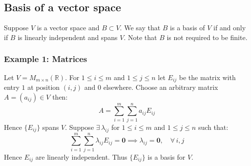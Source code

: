 \documentclass[12pt]{article}
\begin{document}
\subsection*{Basis of a vector space}
Suppose \(V\) is a vector space and \(B\subset V\). We say that \(B\) is a basis of \(V\) if and only if \(B\) is linearly independent and spans \(V\). Note that \(B\) is not required to be finite.
\subsubsection*{Example 1: Matrices}
Let \(V=M_{m\times n}(\mathbb{R})\). For \(1\leq i \leq m\) and \(1\leq j \leq n\) let \(E_{ij}\) be the matrix with entry \(1\) at position \((i,j)\) and \(0\) elsewhere. Choose an arbitrary matrix \(A=(a_{ij})\in V\) then:
\[A=\sum_{i=1}^m\sum_{j=1}^na_{ij}E_{ij}\]
Hence \(\{E_{ij}\}\) spans \(V\). Suppose \(\exists\,\lambda_{ij}\) for \(1\leq i\leq m\) and \(1\leq j\leq n\) such that:
\[\sum_{i=1}^m\sum_{j=1}^n\lambda_{ij}E_{ij}=\textbf{0} \implies \lambda_{ij}=\textbf{0},\quad \forall\, i,j\]
Hence \(E_{ij}\) are linearly independent. Thus \(\{E_{ij}\}\) is a basis for \(V\).
\end{document}
